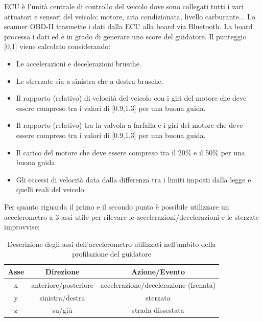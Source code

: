 \documentclass[12pt, a4paper, italian]{report}
\numberwithin{figure}{chapter}
\numberwithin{table}{chapter}
\begin{document}
\vspace{0.8cm}

ECU è l'unità centrale di controllo del veicolo dove sono collegati tutti i vari attuatori e sensori del veicolo: motore, aria condizionata, livello carburante... Lo scanner OBD-II trasmette i dati dalla ECU alla board via Bluetooth. La board processa i dati ed è in grado di generare uno score del guidatore. Il punteggio [0,1] viene calcolato considerando:

\begin{itemize}
    \item Le accelerazioni e decelerazioni brusche.
    \item Le strerzate sia a sinistra che a destra brusche.
    \item Il rapporto (relativo) di velocità del veicolo con i giri del motore che deve essere compreso tra i valori di [0.9,1.3] per una buona guida.
    \item Il rapporto (relativo) tra la valvola a farfalla e i giri del motore che deve essere compreso tra i valori di [0.9,1.3] per una buona guida.
    \item Il carico del motore che deve essere compreso tra il 20\% e il 50\% per una buona guida
    \item Gli eccessi di velocità data dalla differenza tra i limiti imposti dalla legge e quelli reali del veicolo
\end{itemize}

Per quanto riguarda il primo e il secondo punto è possibile utilizzare un accelerometro a 3 assi utile per rilevare  le accelerazioni/decelerazioni e le sterzate improvvise: 

\begin{table}[h!]
  \centering
  \begin{tabular}{|c|c|c|}
    \hline
    \textbf{Asse} & \textbf{Direzione} & \textbf{Azione/Evento} \\
    \hline
    x & anteriore/posteriore & accelerazione/decelerazione (frenata) \\
    \hline
    y & sinistra/destra & sterzata \\
    \hline
    z & su/giù & strada dissestata \\
    \hline
  \end{tabular}
  \caption{Descrizione degli assi dell'accelerometro utilizzati nell'ambito della profilazione del guidatore}
  \label{tab:example}
\end{table}
\end{document}
